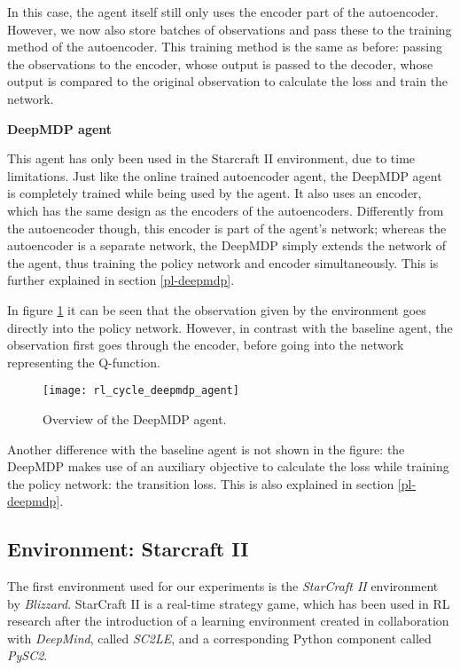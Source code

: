 In this case, the agent itself still only uses the encoder part of the autoencoder. However, we now also store batches of observations and pass these to the training method of the autoencoder. This training method is the same as before: passing the observations to the encoder, whose output is passed to the decoder, whose output is compared to the original observation to calculate the loss and train the network.\newline\par

\noindent \textbf{DeepMDP agent} \par
\noindent This agent has only been used in the Starcraft II environment, due to time limitations. Just like the online trained autoencoder agent, the DeepMDP agent is completely trained while being used by the agent. It also uses an encoder, which has the same design as the encoders of the autoencoders. Differently from the autoencoder though, this encoder is part of the agent's network; whereas the autoencoder is a separate network, the DeepMDP simply extends the network of the agent, thus training the policy network and encoder simultaneously. This is further explained in section \ref{pl-deepmdp}.

In figure \ref{fig:rl_cycle_deepmdp} it can be seen that the observation given by the environment goes directly into the policy network. However, in contrast with the baseline agent, the observation first goes through the encoder, before going into the network representing the Q-function.

\begin{figure}[h]
    \centering
    \texttt{[image: rl\_cycle\_deepmdp\_agent]}
    \caption{Overview of the DeepMDP agent.}
    \label{fig:rl_cycle_deepmdp}
\end{figure}

Another difference with the baseline agent is not shown in the figure: the DeepMDP makes use of an auxiliary objective to calculate the loss while training the policy network: the transition loss. This is also explained in section \ref{pl-deepmdp}.

\subsection{Environment: Starcraft II}\label{research-env-pysc2}
The first environment used for our experiments is the \emph{StarCraft II} environment by \emph{Blizzard}\cite{blizzard}. StarCraft II is a real-time strategy game, which has been used in RL research after the introduction of a learning environment created in collaboration with \emph{DeepMind}, called \emph{SC2LE}, and a corresponding Python component called \emph{PySC2}\cite{pysc2}.


